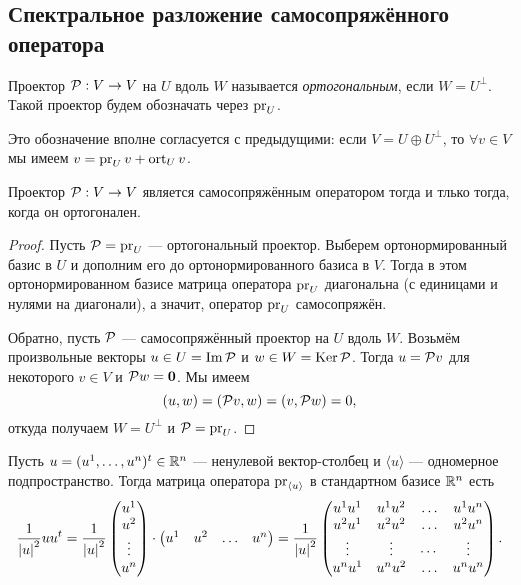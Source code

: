 \subsection{Спектральное разложение самосопряжённого оператора}

\setcounter{definition}{0}
\setcounter{proposal}{0}
\setcounter{lemma}{0}
\setcounter{theorem}{0}

\begin{definition}
    Проектор $\P: V \to V$ на $U$ вдоль $W$ называется \textit{ортогональным}, если $W = U^\perp$. Такой проектор будем обозначать через $\pr_U$.

    Это обозначение вполне согласуется с предыдущими: если $V = U \oplus U^\perp$, то $\forall v \in V$ мы имеем $v = \pr_Uv + \ort_Uv$.
\end{definition}

\begin{proposal}
    Проектор $\P: V \to V$ является самосопряжённым оператором тогда и тлько тогда, когда он ортогонален.
\end{proposal}

\begin{proof}
    Пусть $\P = \pr_U$ --- ортогональный проектор. Выберем ортонормированный базис в $U$ и дополним его до ортонормированного базиса в $V$. Тогда в этом ортонормированном базисе матрица оператора $\pr_U$ диагональна (с единицами и нулями на диагонали), а значит, оператор $\pr_U$ самосопряжён.

    Обратно, пусть $\P$ --- самосопряжённый проектор на $U$ вдоль $W$. Возьмём произвольные векторы $u \in U = \Im\P$ и $w \in W = \Ker\P$. Тогда $u = \P v$ для некоторого $v \in V$ и $\P w = \bs{0}$. Мы имеем
    \[
        (u, w) = (\P v, w) = (v, \P w) = 0,
    \]
    откуда получаем $W = U^\perp$ и $\P = \pr_U$.
\end{proof}

\begin{example}
    Пусть $u = (u^1, \ldots, u^n)^t \in \R^n$ --- ненулевой вектор-столбец и $\langle u\rangle$ --- одномерное подпространство. Тогда матрица оператора $\pr_{\langle u\rangle}$ в стандартном базисе $\R^n$ есть
    \[
        \frac{1}{\abs{u}^2}uu^t = \frac{1}{\abs{u}^2}
        \begin{pmatrix}
            u^1\\
            u^2\\
            \vdots\\
            u^n
        \end{pmatrix} \cdot 
        \begin{pmatrix}
            u^1 & u^2 & \ldots & u^n
        \end{pmatrix} = \frac{1}{\abs{u}^2}
        \begin{pmatrix}
            u^1u^1 & u^1u^2 & \ldots & u^1u^n\\
            u^2u^1 & u^2u^2 & \ldots & u^2u^n\\
            \vdots & \vdots & \cdots & \vdots\\
            u^nu^1 & u^nu^2 & \ldots & u^nu^n\\
        \end{pmatrix}.
    \]
\end{example}

